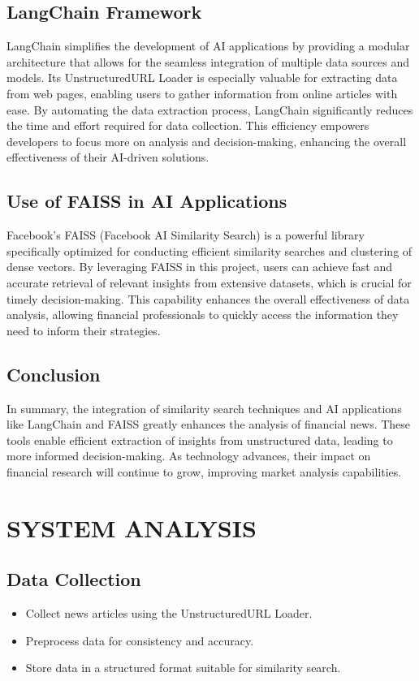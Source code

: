 \documentclass[12pt,a4paper]{report}
\begin{document}
{\section{LangChain Framework}
LangChain simplifies the development of AI applications by providing a modular architecture that allows for the seamless integration of multiple data sources and models. Its UnstructuredURL Loader is especially valuable for extracting data from web pages, enabling users to gather information from online articles with ease. By automating the data extraction process, LangChain significantly reduces the time and effort required for data collection. This efficiency empowers developers to focus more on analysis and decision-making, enhancing the overall effectiveness of their AI-driven solutions.

\section{Use of FAISS in AI Applications}
Facebook’s FAISS (Facebook AI Similarity Search) is a powerful library specifically optimized for conducting efficient similarity searches and clustering of dense vectors. By leveraging FAISS in this project, users can achieve fast and accurate retrieval of relevant insights from extensive datasets, which is crucial for timely decision-making. This capability enhances the overall effectiveness of data analysis, allowing financial professionals to quickly access the information they need to inform their strategies.
\section{Conclusion}
In summary, the integration of similarity search techniques and AI applications like LangChain and FAISS greatly enhances the analysis of financial news. These tools enable efficient extraction of insights from unstructured data, leading to more informed decision-making. As technology advances, their impact on financial research will continue to grow, improving market analysis capabilities.
\chapter{SYSTEM ANALYSIS}

\section{Data Collection}
\begin{itemize}
	\item Collect news articles using the UnstructuredURL Loader.
	\item Preprocess data for consistency and accuracy.
	\item Store data in a structured format suitable for similarity search.
	

\end{itemize}}
\end{document}
